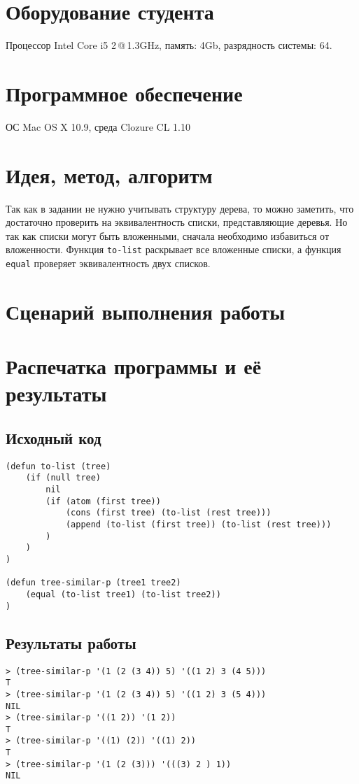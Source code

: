 \documentclass[a4paper, 12pt]{article}
\begin{document}
\section{Оборудование студента}
Процессор Intel Core i5 2\,@\,1.3GHz, память: 4Gb, разрядность системы: 64.


\section{Программное обеспечение}
ОС Mac OS X 10.9, среда Clozure CL 1.10


\section{Идея, метод, алгоритм}
Так как в задании не нужно учитывать структуру дерева, то можно заметить, что достаточно проверить на эквивалентность списки, представляющие деревья. Но так как списки могут быть вложенными, сначала необходимо избавиться от вложенности. Функция {\tt to-list} раскрывает все вложенные списки, а функция {\tt equal} проверяет эквивалентность двух списков.


\section{Сценарий выполнения работы}


\section{Распечатка программы и её результаты}

\subsection{Исходный код}
\begin{lstlisting}
(defun to-list (tree)
    (if (null tree)
        nil
        (if (atom (first tree))
            (cons (first tree) (to-list (rest tree)))
            (append (to-list (first tree)) (to-list (rest tree)))
        )
    )
)

(defun tree-similar-p (tree1 tree2)
    (equal (to-list tree1) (to-list tree2))
)
\end{lstlisting}


\subsection{Результаты работы}
\begin{lstlisting}
> (tree-similar-p '(1 (2 (3 4)) 5) '((1 2) 3 (4 5)))
T
> (tree-similar-p '(1 (2 (3 4)) 5) '((1 2) 3 (5 4)))
NIL
> (tree-similar-p '((1 2)) '(1 2))
T
> (tree-similar-p '((1) (2)) '((1) 2))
T
> (tree-similar-p '(1 (2 (3))) '(((3) 2 ) 1))
NIL
\end{lstlisting}
\end{document}
